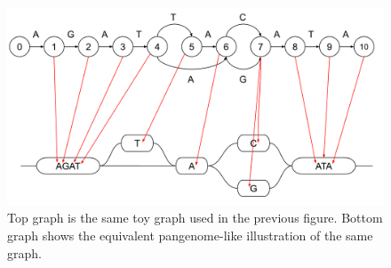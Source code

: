 \documentclass[11pt]{ucthesis}
\begin{document}
\begin{figure}[h]
    \centering
    \includegraphics[width=\linewidth]{Images/Pangenome Graph.pdf}
    \caption[Mapping simple graphs to pangenome-like graphs]{Top graph is the same toy graph used in the previous figure. Bottom graph shows the equivalent pangenome-like illustration of the same graph.
}
    \label{fig:2:3}
\end{figure}
\end{document}
